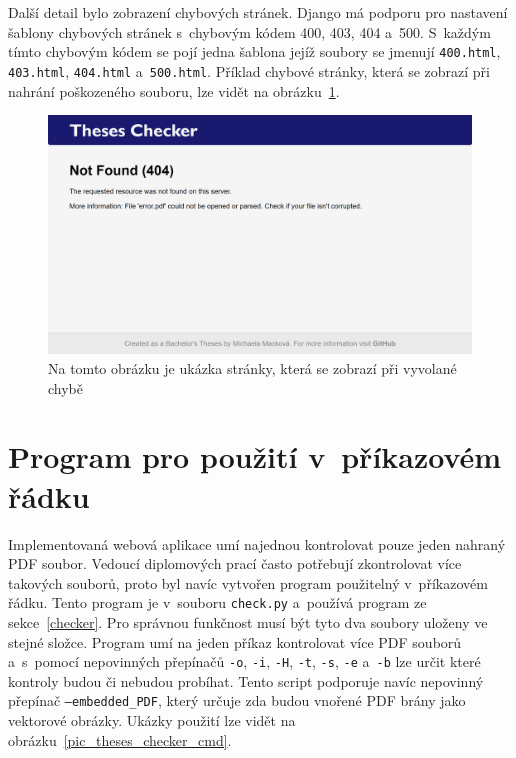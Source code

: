 Další detail bylo zobrazení chybových stránek. Django má podporu pro nastavení
šablony chybových stránek s~chybovým kódem 400, 403, 404 a~500. S~každým tímto
chybovým kódem se pojí jedna šablona jejíž soubory se jmenují \texttt{400.html},
\texttt{403.html}, \texttt{404.html} a~\texttt{500.html}. Příklad chybové
stránky, která se zobrazí při nahrání poškozeného souboru, lze vidět na
obrázku~\ref{pic_theses_checker_error}.

\begin{figure}[H]
    \centering
    \includegraphics[width=\linewidth]{obrazky-figures/screenshot-error.png}
    \caption{
        Na tomto obrázku je ukázka stránky, která se zobrazí při vyvolané chybě 
    }
    \label{pic_theses_checker_error}
\end{figure}



\section{Program pro použití v~příkazovém řádku}

Implementovaná webová aplikace umí najednou kontrolovat pouze jeden nahraný PDF
soubor. Vedoucí diplomových prací často potřebují zkontrolovat více takových
souborů, proto byl navíc vytvořen program použitelný v~příkazovém řádku. 
Tento program je v~souboru \texttt{check.py} a~používá program ze
sekce~\ref{checker}. Pro správnou funkčnost musí být tyto dva soubory uloženy ve
stejné složce. Program umí na jeden příkaz kontrolovat více PDF souborů
a~s~pomocí nepovinných přepínačů \texttt{-o}, \texttt{-i}, \texttt{-H}, 
\texttt{-t}, \texttt{-s}, \texttt{-e} a~\texttt{-b} lze určit které kontroly
budou či nebudou probíhat. Tento script podporuje navíc nepovinný přepínač
\texttt{--embedded\_PDF}, který určuje zda budou vnořené PDF brány jako
vektorové obrázky. Ukázky použití lze vidět na 
obrázku~\ref{pic_theses_checker_cmd}.

